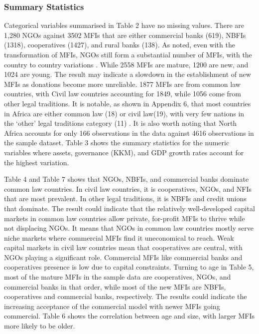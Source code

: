 \documentclass[a4paper, nobind]{templates/ociamthesis}
\begin{document}
\hypertarget{summary-statistics}{%
\subsubsection{Summary Statistics}\label{summary-statistics}}

Categorical variables summarised in Table 2 have no missing values. There are 1,280 NGOs against 3502 MFIs that are either commercial banks (619), NBFIs (1318), cooperatives (1427), and rural banks (138). As noted, even with the transformation of MFIs, NGOs still form a substantial number of MFIs, with the country to country variations \autocite{d2017ngos}. While 2558 MFIs are mature, 1200 are new, and 1024 are young. The result may indicate a slowdown in the establishment of new MFIs as donations become more unreliable. 1877 MFIs are from common law countries, with Civil law countries accounting for 1849, while 1056 come from other legal traditions. It is notable, as shown in Appendix 6, that most countries in Africa are either common law (18) or civil law(19), with very few nations in the `other' legal traditions category (11) \autocite{oto2014distribution}. It is also worth noting that North Africa accounts for only 166 observations in the data against 4616 observations in the sample dataset. Table 3 shows the summary statistics for the numeric variables where assets, governance (KKM), and GDP growth rates account for the highest variation.

Table 4 and Table 7 shows that NGOs, NBFIs, and commercial banks dominate common law countries. In civil law countries, it is cooperatives, NGOs, and NFIs that are most prevalent. In other legal traditions, it is NBFIs and credit unions that dominate. The result could indicate that the relatively well-developed capital markets in common law countries allow private, for-profit MFIs to thrive while not displacing NGOs. It means that NGOs in common law countries mostly serve niche markets where commercial MFIs find it uneconomical to reach. Weak capital markets in civil law countries mean that cooperatives are central, with NGOs playing a significant role. Commercial MFIs like commercial banks and cooperatives presence is low due to capital constraints. Turning to age in Table 5, most of the mature MFIs in the sample data are cooperatives, NGOs, and commercial banks in that order, while most of the new MFIs are NBFIs, cooperatives and commercial banks, respectively. The results could indicate the increasing acceptance of the commercial model with newer MFIs going commercial. Table 6 shows the correlation between age and size, with larger MFIs more likely to be older.
\end{document}
